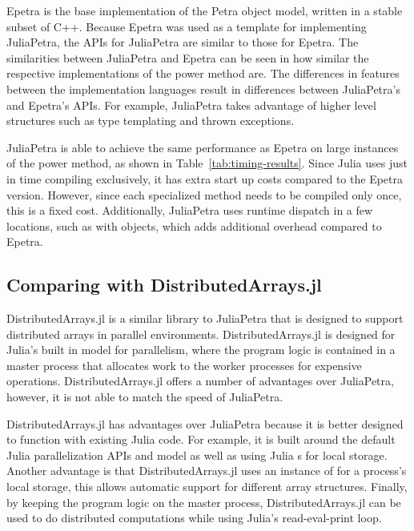 \documentclass[acmsmall]{acmart}
\newcommand{\juliaSnippet}[1]{\texttt{\detokenize{#1}}}
\begin{document}
Epetra is the base implementation of the Petra object model,
written in a stable subset of C++. \cite{OverviewOfTrilinos}
Because Epetra was used as a template for implementing JuliaPetra,
the APIs for JuliaPetra are similar to those for Epetra.
The similarities between JuliaPetra and Epetra can be seen in how similar the respective implementations
of the power method are.
The differences in features between the implementation languages result in differences
between JuliaPetra's and Epetra's APIs.
For example, JuliaPetra takes advantage of higher level structures
such as type templating and thrown exceptions.

JuliaPetra is able to achieve the same performance as Epetra on large instances of the power method,
as shown in Table~\ref{tab:timing-results}.
Since Julia uses just in time compiling exclusively, it has extra start up costs compared to
the Epetra version. However, since each specialized method needs to be compiled only once,
this is a fixed cost.
Additionally, JuliaPetra uses runtime dispatch in a few locations, such as with
\juliaSnippet{Comm} objects, which adds additional overhead compared to Epetra.

\subsection{Comparing with DistributedArrays.jl}

DistributedArrays.jl is a similar library to JuliaPetra that is designed to support
distributed arrays in parallel environments. \cite{DAGithub}
DistributedArrays.jl is designed for Julia's built in model for parallelism, where the program logic is
contained in a master process that allocates work to the worker processes for expensive operations.
\cite{JuliaFreshApproach}
DistributedArrays.jl offers a number of advantages over JuliaPetra, however, it is not able to
match the speed of JuliaPetra.

DistributedArrays.jl has advantages over JuliaPetra because it is better designed to function with
existing Julia code.
For example, it is built around the default Julia parallelization APIs and model as well as using
Julia \juliaSnippet{AbstractArray}s for local storage.
Another advantage is that DistributedArrays.jl uses an instance of \juliaSnippet{AbstractArray}
for a process's local storage, this allows automatic support for different array structures.
Finally, by keeping the program logic on the master process, DistributedArrays.jl can be used to
do distributed computations while using Julia's read-eval-print loop.
\end{document}
